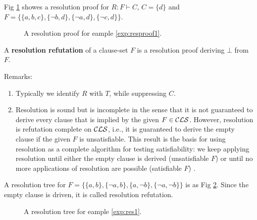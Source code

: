 \documentclass[12pt]{book}
\begin{document}
 \begin{examp}\label{exp:resproof1}
      Fig \ref{fig:proof1} showes a resolution proof for  $R: F \vdash C$, $C=\{d\}$ and $F = \{\{a,b,c\},\{\neg b,d\},\{\neg a, d\},\{\neg c, d\}\}$. 
	   \begin{figure}
	   \centering  
	   \caption{A resolution proof for eample  \ref{exp:resproof1}.}
	   \label{fig:proof1}
       \end{figure}
\end{examp}

\begin{defi}\label{def:resrefutation}
  A \textbf{resolution refutation} of a clause-set $F$ is a resolution proof deriving $\bot$ from $F$. 
\end{defi}
  
Remarks:
\begin{enumerate}
      \item Typically we identify $R$ with $T$, while suppressing $C$.
	  \item Resolution is sound but is incomplete in the sense that it is not guaranteed to derive every clause that is implied by the given $F \in \mathcal{CLS}$. 
	  However, resolution is refutation complete on $\mathcal{CLS}$, i.e., it is guaranteed to derive the empty clause if the given $F$ is unsatisfiable. 
	  This result is the basis for using resolution as a complete algorithm for testing satisfiability: we keep applying resolution until either 
	  the empty clause is derived (unsatisfiable $F$) or until no more applications of resolution are possible (satisfiable $F$) \cite{h6}.
\end{enumerate}

 \begin{examp}\label{exp:res1}
      A resolution tree for $F = \{\{a,b\},\{\neg a,b\},\{a, \neg b\},\{\neg a, \neg b\}\}$ is as Fig \ref{fig:resol1}. Since the empty clause 
	  is driven, it is called resolution refutation.
	   \begin{figure}
	   \centering  
	   \caption{A resolution tree for eample  \ref{exp:res1}.}
	   \label{fig:resol1}
       \end{figure}
\end{examp}
\end{document}
